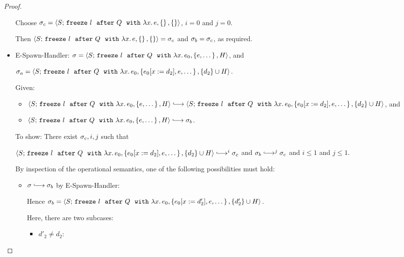 \begin{proof}
\begin{itemize}
      Choose $\sigma_c =
      \langle S;\, \mbox{\texttt{freeze}}~l~~{\mbox{\texttt{after}}}~Q~~{\mbox{\texttt{with}}}~\lambda x.\,e, \left\{\right\}, \left\{\right\} \rangle$,
      $i = 0$ and $j = 0$.

      Then
      $\langle S;\, \mbox{\texttt{freeze}}~l~~{\mbox{\texttt{after}}}~Q~~{\mbox{\texttt{with}}}~\lambda x.\,e, \left\{\right\}, \left\{\right\} \rangle
      = \sigma_c$ and $\sigma_b = \sigma_c$, as required.

    \item {\sc E-Spawn-Handler}: $\sigma =
      \langle S;\, \mbox{\texttt{freeze}}~l~~{\mbox{\texttt{after}}}~Q~~{\mbox{\texttt{with}}}~\lambda x.\,e_0, \left\{e,
            \dots\right\}, H \rangle$, and

      $\sigma_a =
      \langle S;\, \mbox{\texttt{freeze}}~l~~{\mbox{\texttt{after}}}~Q~~{\mbox{\texttt{with}}}~\lambda x.\,e_0, \left\{e_0[x := d_2],
            e, \dots\right\}, \{d_2\}\cup H \rangle$.

      Given:
      \begin{itemize}
      \item $\config{S}{\freezeafterfull{l}{Q}{\lam{x}{e_0}}{\setof{e,
            \dots}}{H}} \parstepsto \\
        \config{S}{\freezeafterfull{l}{Q}{\lam{x}{e_0}}{\setof{\subst{e_0}{x}{d_2},
              e, \dots}} {\{d_2\}\cup H}}$, and
      \item $\config{S}{\freezeafterfull{l}{Q}{\lam{x}{e_0}}{\setof{e,
            \dots}}{H}} \parstepsto \conf_b$.
      \end{itemize}

      To show: There exist $\sigma_c, i, j$ such that

      $\config{S}{\freezeafterfull{l}{Q}{\lam{x}{e_0}}{\setof{\subst{e_0}{x}{d_2},
            e, \dots}} {\{d_2\}\cup H}} \parstepsto^i \conf_c$ and
      $\conf_b \parstepsto^j \conf_c$ and $i \leq 1$ and $j \leq 1$.


      By inspection of the operational semantics, one of the following
      possibilities must hold:
      \begin{itemize}
      \item $\conf \parstepsto \conf_b$ by {\sc E-Spawn-Handler}:

        Hence $\sigma_b =
        \langle S;\, \mbox{\texttt{freeze}}~l~~{\mbox{\texttt{after}}}~Q~~{\mbox{\texttt{with}}}~\lambda x.\,e_0, \left\{e_0[x := d'_2],
              e, \dots\right\}, \{d'_2\}\cup H \rangle$.

        Here, there are two subcases:
        \begin{itemize}
        \item $d'_2 \neq d_2$:


\end{itemize}
\end{itemize}
\end{itemize}
\end{proof}
